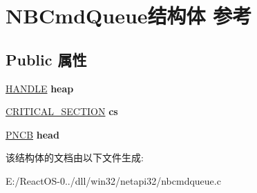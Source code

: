 \hypertarget{struct_n_b_cmd_queue}{}\section{N\+B\+Cmd\+Queue结构体 参考}
\label{struct_n_b_cmd_queue}
\subsection*{Public 属性}
\begin{DoxyCompactItemize}
\item 
\mbox{\label{struct_n_b_cmd_queue_abdfabebdfeeed12901445746df4ef771}} 
\hyperlink{interfacevoid}{H\+A\+N\+D\+LE} {\bfseries heap}
\item 
\mbox{\label{struct_n_b_cmd_queue_aea9dde48db4c7f847c19aec7fe8ea233}} 
\hyperlink{struct___c_r_i_t_i_c_a_l___s_e_c_t_i_o_n}{C\+R\+I\+T\+I\+C\+A\+L\+\_\+\+S\+E\+C\+T\+I\+ON} {\bfseries cs}
\item 
\mbox{\label{struct_n_b_cmd_queue_a889980cce1a4aa018d5a5c2225ef226e}} 
\hyperlink{struct___n_c_b}{P\+N\+CB} {\bfseries head}
\end{DoxyCompactItemize}


该结构体的文档由以下文件生成\+:\begin{DoxyCompactItemize}
\item 
E\+:/\+React\+O\+S-\/0../dll/win32/netapi32/nbcmdqueue.\+c\end{DoxyCompactItemize}
